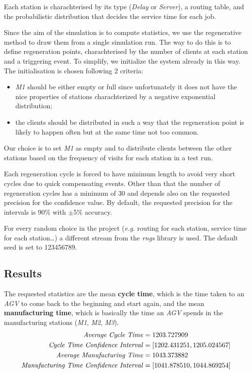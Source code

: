 \documentclass[paper=a4, fontsize=11pt]{scrartcl}
\numberwithin{equation}{section}		%
\numberwithin{figure}{section}			%
\numberwithin{table}{section}				%
\begin{document}
Each station is charachterised by its type (\textit{Delay} or \textit{Server}), a routing table, and the probabilistic distribution that decides the service time for each job.

Since the aim of the simulation is to compute statistics, we use the regenerative method to draw them from a single simulation run. The way to do this is to define regeneration points, charachterised by the number of clients at each station and a triggering event. To simplify, we initialize the system already in this way.
The initialisation is chosen following 2 criteria:
\begin{itemize}
	\item \textit{M1} should be either empty or full since unfortunately it does not have the nice properties of stations charachterized by a negative exponential distribution;
	\item the clients should be distributed in such a way that the regeneration point is likely to happen often but at the same time not too common.
\end{itemize}
Our choice is to set \textit{M1} as empty and to distribute clients between the other stations based on the frequency of visits for each station in a test run.

Each regeneration cycle is forced to have minimum length to avoid very short cycles due to quick compensating events. Other than that the number of regeneration cycles has a minimum of 30 and depends also on the requested precision for the confidence value. By default, the requested precision for the intervals is 90\% with $\pm$5\% accuracy.

For every random choice in the project (\textit{e.g.} routing for each station, service time for each station\dots) a different stream from the \textit{rngs} library is used. The default seed is set to 123456789.

\subsection{Results}
The requested statistics are the mean \textbf{cycle time}, which is the time taken to an \textit{AGV} to come back to the beginning and start again, and the mean \textbf{manufacturing time}, which is basically the time an \textit{AGV} spends in the manufacturing stations (\textit{M1}, \textit{M2}, \textit{M3}).
\begin{align}
\text{\textit{Average Cycle Time}} &= 1203.727909 \\
\text{\textit{Cycle Time Confidence Interval}} &= [1202.431251, 1205.024567] \\
\text{\textit{Average Manufacturing Time}} &= 1043.373882 \\
\text{\textit{Manufacturing Time Confidence Interval}} &= [1041.878510, 1044.869254]
\end{align}
\end{document}
